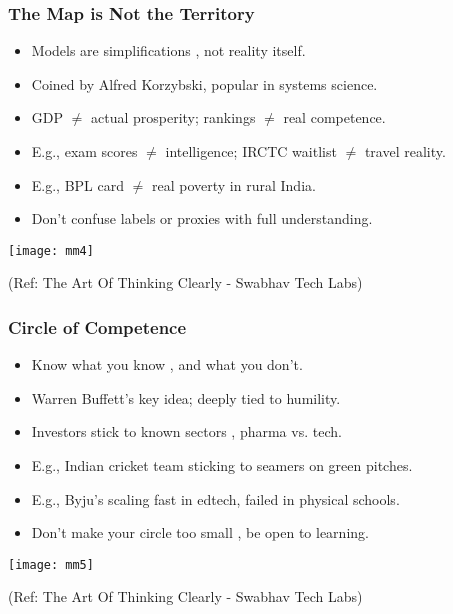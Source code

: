\begin{frame}[fragile]\frametitle{The Map is Not the Territory}
  \begin{itemize}
    \item Models are simplifications , not reality itself.
    \item Coined by Alfred Korzybski, popular in systems science.
    \item GDP $\neq$ actual prosperity; rankings $\neq$ real competence.
    \item E.g., exam scores $\neq$ intelligence; IRCTC waitlist $\neq$ travel reality.
    \item E.g., BPL card $\neq$ real poverty in rural India.
    \item Don't confuse labels or proxies with full understanding.
  \end{itemize}
  
	\begin{center}
	\texttt{[image: mm4]}
	\end{center}
	
{\tiny (Ref: The Art Of Thinking Clearly - Swabhav Tech Labs)}  	 
\end{frame}

\begin{frame}[fragile]\frametitle{Circle of Competence}
  \begin{itemize}
    \item Know what you know , and what you don't.
    \item Warren Buffett's key idea; deeply tied to humility.
    \item Investors stick to known sectors , pharma vs. tech.
    \item E.g., Indian cricket team sticking to seamers on green pitches.
    \item E.g., Byju's scaling fast in edtech, failed in physical schools.
    \item Don't make your circle too small , be open to learning.
  \end{itemize}
  
	\begin{center}
	\texttt{[image: mm5]}
	\end{center}
	
{\tiny (Ref: The Art Of Thinking Clearly - Swabhav Tech Labs)}    
\end{frame}

